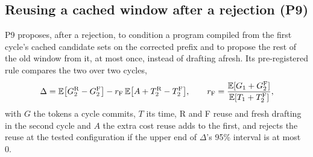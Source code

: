 \subsection{Reusing a cached window after a rejection (P9)}\label{app:p9}
P9 proposes, after a rejection, to condition a program compiled from the first cycle's cached candidate sets on the corrected prefix and to propose the rest of the old window from it, at most once, instead of drafting afresh. Its pre-registered rule compares the two over two cycles,
\begin{equation}\label{eq:p9}
\Delta=\mathbb E\bigl[G_2^{\rm R}-G_2^{\rm F}\bigr]-r_{\rm F}\,\mathbb E\bigl[A+T_2^{\rm R}-T_2^{\rm F}\bigr],\qquad r_{\rm F}=\frac{\mathbb E[G_1+G_2^{\rm F}]}{\mathbb E[T_1+T_2^{\rm F}]},
\end{equation}
with $G$ the tokens a cycle commits, $T$ its time, R and F reuse and fresh drafting in the second cycle and $A$ the extra cost reuse adds to the first, and rejects the reuse at the tested configuration if the upper end of $\Delta$'s 95\% interval is at most 0.

